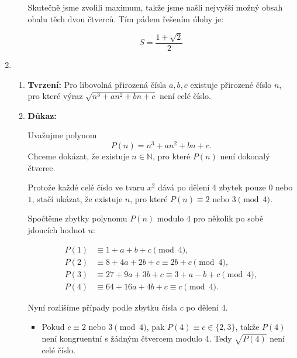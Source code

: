 \documentclass[12pt]{article}
\begin{document}
\begin{enumerate}
\begin{enumerate}
      Skutečně jsme zvolili maximum, takže jsme našli nejvyšší možný obsah obalu těch dvou čtverců.
      Tím pádem řešením úlohy je:

      \[
      S = \frac{1+\sqrt{2}}{2}
      \]

      

    \end{enumerate}






  \setcounter{enumi}{4}

  \item
    \begin{enumerate} 
      \item \textbf{Tvrzení:}
        Pro libovolná přirozená čísla \(a,b,c\) existuje přirozené číslo \(n\),
        pro které výraz \(\sqrt{n^3 + a n^2 + b n + c}\) není celé číslo.
        
        \bigskip
      \item \textbf{Důkaz:}
        
        Uvažujme polynom
        \[
          P(n) = n^3 + a n^2 + b n + c.
          \]
          Chceme dokázat, že existuje \(n \in \mathbb{N}\), pro které \(P(n)\) není dokonalý čtverec.
          
          Protože každé celé číslo ve tvaru \(x^2\) dává po dělení 4 zbytek pouze \(0\) nebo \(1\),
          stačí ukázat, že existuje \(n\), pro které \(P(n) \equiv 2 \text{ nebo } 3 \pmod 4.\)
          
          \medskip
          Spočtěme zbytky polynomu \(P(n)\) modulo 4 pro několik po sobě jdoucích hodnot \(n\):
          
          \[
            \begin{aligned}
              P(1) &\equiv 1 + a + b + c \pmod 4,\\
              P(2) &\equiv 8 + 4a + 2b + c \equiv 2b + c \pmod 4,\\
              P(3) &\equiv 27 + 9a + 3b + c \equiv 3 + a - b + c \pmod 4,\\
              P(4) &\equiv 64 + 16a + 4b + c \equiv c \pmod 4.
            \end{aligned}
            \]
            
            \medskip
            Nyní rozlišíme případy podle zbytku čísla \(c\) po dělení 4.
            
            \begin{itemize}
              \item Pokud \(c \equiv 2\) nebo \(3 \pmod 4\), pak \(P(4) \equiv c \in \{2,3\}\),
              takže \(P(4)\) není kongruentní s žádným čtvercem modulo 4. 
              Tedy \(\sqrt{P(4)}\) není celé číslo.
              

\end{itemize}
\end{enumerate}
\end{enumerate}
\end{document}
